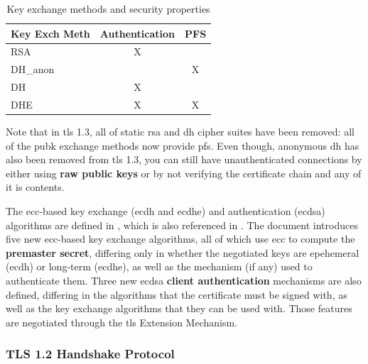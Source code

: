 \documentclass{llncs}
\begin{document}
\begin{table}[]
\centering
\caption{Key exchange methods and security properties}
\label{kemsp}
\begin{tabular}{|l|c|l|}
\hline
\textbf{Key Exch Meth} & \multicolumn{1}{l|}{Authentication} & PFS                    \\ \hline
RSA                          & X                                   &                        \\ \hline
DH\_anon                     & \multicolumn{1}{l|}{}               & \multicolumn{1}{c|}{X} \\ \hline
DH                           & X                                   &                        \\ \hline
DHE                          & X                                   & \multicolumn{1}{c|}{X} \\ \hline
\end{tabular}
\end{table}

Note that in \gls{tls} 1.3, all of static \gls{rsa} and \gls{dh} cipher suites
have been removed: all of the \gls{pubk} exchange methods now provide \gls{pfs}.
Even though, anonymous \gls{dh} has also been removed from \gls{tls} 1.3, you can
still have unauthenticated connections by either using \textbf{raw public keys} \cite{RFC7250}
or by not verifying the certificate chain and any of it is contents.

The \gls{ecc}-based key exchange (\gls{ecdh} and \gls{ecdhe}) and authentication (\gls{ecdsa})
algorithms are defined in  \cite{RFC4292}, which is also referenced
in  \cite{RFC4256}. The document introduces five new
\gls{ecc}-based key exchange algorithms, all of which use \gls{ecc} to compute
the \textbf{premaster secret}, differing only in whether the negotiated
keys are epehemeral (\gls{ecdh}) or long-term (\gls{ecdhe}), as well as the mechanism (if any) used to
authenticate them. Three new \gls{ecdsa} \textbf{client authentication} mechanisms are also defined,
differing in the algorithms that the certificate must be signed with, as well
as the key exchange algorithms that they can be used with.
Those features are negotiated through the \gls{tls} Extension Mechanism.

\subsubsection{TLS 1.2 Handshake Protocol}
\end{document}
